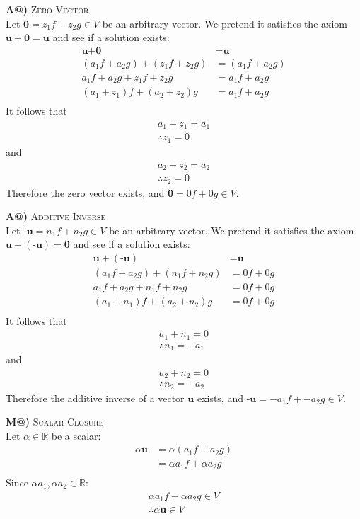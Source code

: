 \documentclass[10pt, letterpaper]{article}
\makeatletter
\newcommand*{\rom}[1]{\expandafter\@slowromancap\romannumeral #1@}
\makeatother
\begin{document}
\textbf{A\rom{3})} \textsc{Zero Vector} \\
Let $ \textbf{0} = z_1f + z_2g \in V $ be an arbitrary vector. 
We pretend it satisfies the axiom $\textbf{u} + \textbf{0} = \textbf{u}$ and 
see if a solution exists:
\begin{align*}
    \textbf{u} + \textbf{0} &= \textbf{u} \\
    (a_1f + a_2g) + (z_1f + z_2g) &= (a_1f + a_2g) \\
    a_1f + a_2g + z_1f + z_2g &= a_1f + a_2g \\
    (a_1 + z_1)f + (a_2 + z_2)g &= a_1f + a_2g \\
\end{align*}
It follows that
\begin{gather*}
    a_1 + z_1 = a_1 \\
    \therefore z_1 = 0
\end{gather*}
and
\begin{gather*}
    a_2 + z_2 = a_2 \\
    \therefore z_2 = 0
\end{gather*}
Therefore the zero vector exists, and $ \textbf{0} = 0f + 0g \in V $.

\textbf{A\rom{4})} \textsc{Additive Inverse} \\
Let $ \textbf{-u} = n_1f + n_2g \in V $ be an arbitrary vector. 
We pretend it satisfies the axiom $\textbf{u} + (\textbf{-u}) = \textbf{0}$ and 
see if a solution exists:
\begin{align*}
    \textbf{u} + (\textbf{-u}) &= \textbf{u} \\
    (a_1f + a_2g) + (n_1f + n_2g) &= 0f + 0g \\
    a_1f + a_2g + n_1f + n_2g &= 0f + 0g \\
    (a_1 + n_1)f + (a_2 + n_2)g &= 0f + 0g \\
\end{align*}
It follows that
\begin{gather*}
    a_1 + n_1 = 0 \\
    \therefore n_1 = -a_1
\end{gather*}
and
\begin{gather*}
    a_2 + n_2 = 0 \\
    \therefore n_2 = -a_2
\end{gather*}
Therefore the additive inverse of a vector $\textbf{u}$ exists, and $ \textbf{-u} = -a_1f + -a_2g \in V $.

\textbf{M\rom{1})} \textsc{Scalar Closure} \\
Let $\alpha \in \mathbb{R}$ be a scalar:
\begin{align*}
    \alpha \textbf{u} &= \alpha(a_1f + a_2g) \\
    &= \alpha a_1f + \alpha a_2g  \\
\end{align*}
Since $\alpha a_1, \alpha a_2 \in \mathbb{R}$:
\begin{gather*}
    \alpha a_1f + \alpha a_2g \in V \\
    \therefore \alpha \textbf{u} \in V
\end{gather*}
\end{document}
